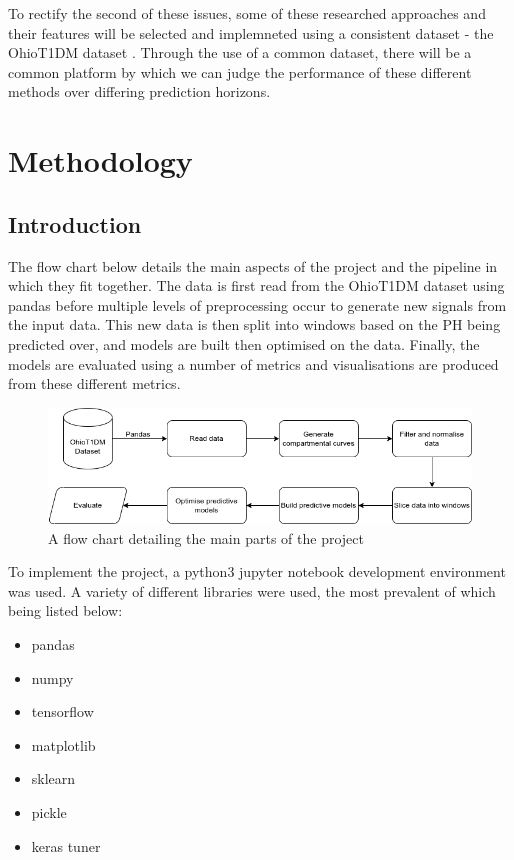       To rectify the second of these issues, some of these researched approaches and their features will be selected and implemneted using a consistent dataset - the OhioT1DM dataset \cite{ohio}. Through the use of a common dataset, there will be a common platform by which we can judge the performance of these different methods over differing prediction horizons.

\section{Methodology} %
    \subsection{Introduction}
      
    The flow chart below details the main aspects of the project and the pipeline in which they fit together. The data is first read from the OhioT1DM dataset using pandas before multiple levels of preprocessing occur to generate new signals from the input data. This new data is then split into windows based on the PH being predicted over, and models are built then optimised on the data. Finally, the models are evaluated using a number of metrics and visualisations are produced from these different metrics.

    \begin{figure}[H]
      \centering
      \includegraphics[width=\textwidth]{images/codeflow.png} 
      \caption{
       A flow chart detailing the main parts of the project
      }
    \end{figure}

    To implement the project, a python3 jupyter notebook development environment was used. A variety of different libraries were used, the most prevalent of which being listed below:
    \begin{itemize}
      \item pandas
      \item numpy
      \item tensorflow
      \item matplotlib
      \item sklearn
      \item pickle
      \item keras tuner
    \end{itemize}
  
